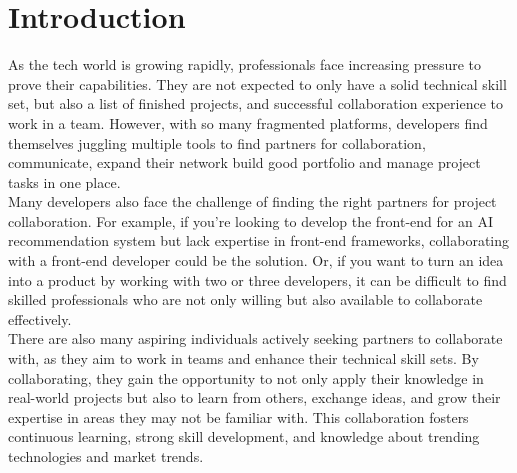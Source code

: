 \documentclass{FastFyp}
\begin{document}
\pagebreak
\pagestyle{fancy} %
\tableofcontents
\pagebreak
\listoffigures	%
\pagebreak
\listoftables %
\mainmatter


\chapter{Introduction}
As the tech world is growing rapidly, professionals face increasing pressure to prove their capabilities. They are not expected to only have a solid technical skill set, but also a list of finished projects, and successful collaboration experience to work in a team. However, with so many fragmented platforms, developers find themselves juggling multiple tools to find partners for collaboration, communicate, expand their network build good portfolio and manage project tasks in one place. \\
Many developers also face the challenge of finding the right partners for project collaboration. For example, if you’re looking to develop the front-end for an AI recommendation system but lack expertise in front-end frameworks, collaborating with a front-end developer could be the solution. Or, if you want to turn an idea into a product by working with two or three developers, it can be difficult to find skilled professionals who are not only willing but also available to collaborate effectively. \\
There are also many aspiring individuals actively seeking partners to collaborate with, as they aim to work in teams and enhance their technical skill sets. By collaborating, they gain the opportunity to not only apply their knowledge in real-world projects but also to learn from others, exchange ideas, and grow their expertise in areas they may not be familiar with. This collaboration fosters continuous learning, strong skill development, and knowledge about trending technologies and market trends.\\
\end{document}
